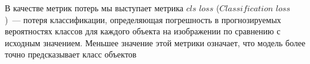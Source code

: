 В качестве метрик потерь мы выступает метрика $\textit{cls loss}$ ($\textit{Classification loss}$)~--- потеря классификации, определяющая погрешность в прогнозируемых вероятностях классов для каждого объекта на изображении по сравнению с исходным значением. Меньшее значение этой метрики означает, что модель более точно предсказывает класс объектов